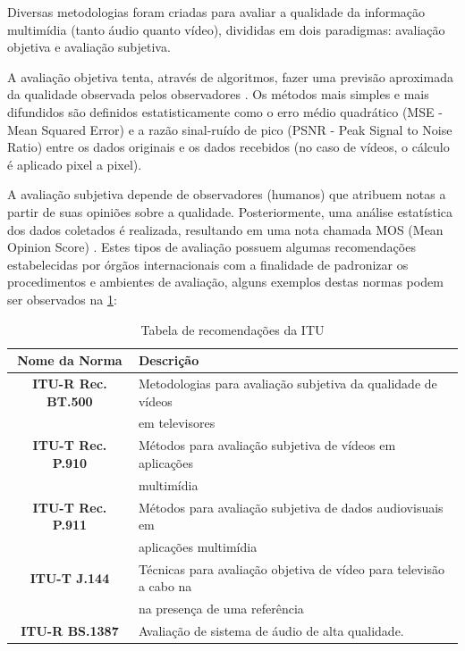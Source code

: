 Diversas metodologias foram criadas para avaliar a qualidade da informação multimídia (tanto áudio quanto vídeo), divididas em dois paradigmas: avaliação objetiva e avaliação subjetiva.

A avaliação objetiva tenta, através de algoritmos, fazer uma previsão aproximada da qualidade observada pelos observadores \cite{albini}. Os métodos mais simples e mais difundidos são definidos estatisticamente como o erro médio quadrático (MSE - Mean Squared Error) e a razão sinal-ruído de pico (PSNR - Peak Signal to Noise Ratio) \cite{emmersonsilva} entre os dados originais e os dados recebidos (no caso de vídeos, o cálculo é aplicado pixel a pixel).

A avaliação subjetiva depende de observadores (humanos) que atribuem notas a partir de suas opiniões sobre a qualidade. Posteriormente, uma análise estatística dos dados coletados é realizada, resultando em uma nota chamada MOS (Mean Opinion Score) \cite{itup930} \cite{albini}. Estes tipos de avaliação possuem algumas recomendações estabelecidas por órgãos internacionais com a finalidade de padronizar os procedimentos e ambientes de avaliação, alguns exemplos destas normas podem ser observados na \ref{tab:recomendacoes}:

\begin{table}
	\centering
	\caption{Tabela de recomendações da ITU}
	\label{tab:recomendacoes}
	\begin{tabular}{c|l}
		\hline
		\textbf{Nome da Norma} & Descrição \\
		\hline
		\textbf{ITU-R Rec. BT.500} & Metodologias para avaliação subjetiva da qualidade de vídeos \\
			& em televisores \\
		\textbf{ITU-T Rec. P.910} & Métodos para avaliação subjetiva de vídeos em aplicações \\
			& multimídia \\
		\textbf{ITU-T Rec. P.911} & Métodos para avaliação subjetiva de dados audiovisuais em \\
			& aplicações multimídia \\
		\textbf{ITU-T J.144} & Técnicas para avaliação objetiva de vídeo para televisão a cabo na \\
			& na presença de uma referência \\
		\textbf{ITU-R BS.1387} & Avaliação de sistema de áudio de alta qualidade. \\
		\hline
	\end{tabular}
\end{table}

